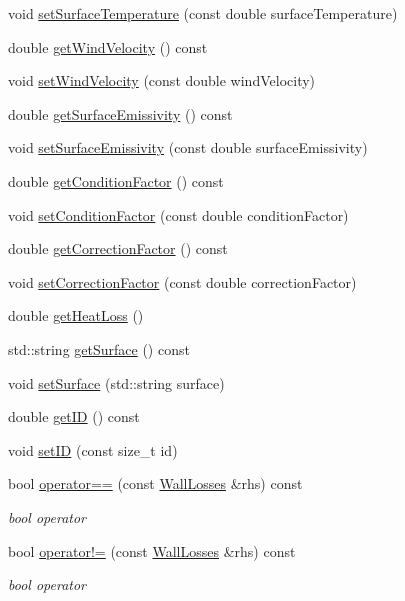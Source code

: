 \begin{DoxyCompactItemize}
void \hyperlink{class_wall_losses_a7aaa1bd0d7e0ec67db33668ccc6c48da}{set\+Surface\+Temperature} (const double surface\+Temperature)
\item 
double \hyperlink{class_wall_losses_ae68657cacdfbaf8cdc48324dd580cf3b}{get\+Wind\+Velocity} () const
\item 
void \hyperlink{class_wall_losses_ae376b7ce4e5b3c45a663395802c176a9}{set\+Wind\+Velocity} (const double wind\+Velocity)
\item 
double \hyperlink{class_wall_losses_ae1fce9523d14831ef6bc9b7823d5ea08}{get\+Surface\+Emissivity} () const
\item 
void \hyperlink{class_wall_losses_ad0ebd1a0a1b32a2358da15b6c8e63d3a}{set\+Surface\+Emissivity} (const double surface\+Emissivity)
\item 
double \hyperlink{class_wall_losses_a16ab4003a17f9e95f28b9390b92c2b27}{get\+Condition\+Factor} () const
\item 
void \hyperlink{class_wall_losses_a1533a7513460d22f433fb670700573a2}{set\+Condition\+Factor} (const double condition\+Factor)
\item 
double \hyperlink{class_wall_losses_a4ce6a0ec36cd868b14b041f18251cb6d}{get\+Correction\+Factor} () const
\item 
void \hyperlink{class_wall_losses_affdf3f6c3d54d73c7f91e1515fb12533}{set\+Correction\+Factor} (const double correction\+Factor)
\item 
double \hyperlink{class_wall_losses_a884da3507498878f619cbe5ba340c0ef}{get\+Heat\+Loss} ()
\item 
std\+::string \hyperlink{class_wall_losses_a10f5de20dc6fead726adbf62a9c49b09}{get\+Surface} () const
\item 
void \hyperlink{class_wall_losses_af329a27b78e1f2d84af6a48ffc59bfad}{set\+Surface} (std\+::string surface)
\item 
double \hyperlink{class_wall_losses_ad67b46094ba89cb759ec124c63c137de}{get\+ID} () const
\item 
void \hyperlink{class_wall_losses_a91526efc0eb1bf030ebc1d864a21acdd}{set\+ID} (const size\+\_\+t id)
\item 
\mbox{\label{class_wall_losses_ad9eebb34927690332c00df51507878e9}} 
bool \hyperlink{class_wall_losses_ad9eebb34927690332c00df51507878e9}{operator==} (const \hyperlink{class_wall_losses}{Wall\+Losses} \&rhs) const
\begin{DoxyCompactList}\small\item\em bool operator \end{DoxyCompactList}\item 
\mbox{\label{class_wall_losses_a46d50205e67870978292c4bfa1c9d329}} 
bool \hyperlink{class_wall_losses_a46d50205e67870978292c4bfa1c9d329}{operator!=} (const \hyperlink{class_wall_losses}{Wall\+Losses} \&rhs) const
\begin{DoxyCompactList}\small\item\em bool operator \end{DoxyCompactList}\end{DoxyCompactItemize}
